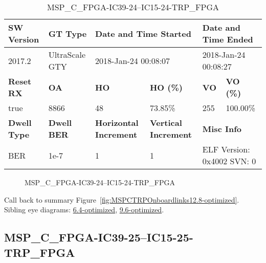 \begin{table}[h]
\centering
\caption{MSP\_C\_FPGA-IC39-24--IC15-24-TRP\_FPGA}
\label{tab:MSPCFPGAIC3924IC1524TRPFPGA12.8-optimized}
\begin{tabular}{@{}|l|l|l|l|l|l|@{}}
\toprule
\textbf{SW Version}                & \textbf{GT Type}   & \multicolumn{2}{l|}{\textbf{Date and Time Started}}            & \multicolumn{2}{l|}{\textbf{Date and Time Ended}}        \\ \midrule
2017.2                       & UltraScale GTY          & \multicolumn{2}{l|}{2018-Jan-24 00:08:07}                   & \multicolumn{2}{l|}{2018-Jan-24 00:08:27}               \\ \midrule
\textbf{Reset RX}                  & \textbf{OA} & \textbf{HO}   & \textbf{HO (\%)} & \textbf{VO} & \textbf{VO (\%)} \\ \midrule
true & 8866        & 48          & 73.85\%        & 255        & 100.00\%       \\ \midrule
\textbf{Dwell Type}                & \textbf{Dwell BER} & \textbf{Horizontal Increment} & \textbf{Vertical Increment}    & \multicolumn{2}{l|}{\textbf{Misc Info}}                  \\ \midrule
BER                            & 1e-7        & 1        & 1           & \multicolumn{2}{l|}{ELF Version: 0x4002 SVN: 0}                         \\ \bottomrule
\end{tabular}
\end{table}

\begin{figure}[h]
\caption{MSP\_C\_FPGA-IC39-24--IC15-24-TRP\_FPGA} \label{fig:MSPCFPGAIC3924IC1524TRPFPGA12.8-optimized}
\end{figure}

Call back to summary Figure~\ref{fig:MSPCTRPOnboardlinks12.8-optimized}.
Sibling eye diagrams: \hyperref[sec:MSPCFPGAIC3924IC1524TRPFPGA6.4-optimized]{6.4-optimized}, \hyperref[sec:MSPCFPGAIC3924IC1524TRPFPGA9.6-optimized]{9.6-optimized}.

\clearpage
\newpage


\subsection{MSP\_C\_FPGA-IC39-25--IC15-25-TRP\_FPGA}\label{sec:MSPCFPGAIC3925IC1525TRPFPGA12.8-optimized}

